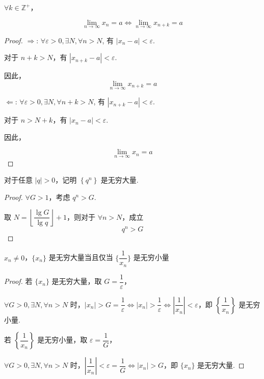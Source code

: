\begin{proposition}
	$\forall k \in \mathbb{Z}^+$，
	
	$$ \lim_{n \to \infty} x_n = a \Leftrightarrow \lim_{n \to \infty} x_{n+k} = a $$
\end{proposition}
\begin{proof}
	$\Rightarrow$: $\forall \varepsilon > 0, \exists N, \forall n > N$, 有 $|x_n - a| < \varepsilon$.
	
	对于 $n + k > N$，有 $|x_{n+k} - a| < \varepsilon$.
	
	因此，
	$$ \lim_{n \to \infty} x_{n+k} = a $$
	
	$\Leftarrow$: $\forall \varepsilon > 0, \exists N, \forall n + k > N$, 有 $|x_{n+k} - a| < \varepsilon$.
	
	对于 $n > N + k$，有 $|x_n - a| < \varepsilon$.
	
	因此，
	
	$$ \lim_{n \to \infty} x_n = a $$
\end{proof}
\begin{example}
	对于任意 $|q| > 0$，记明 $\left\{q^n\right\}$ 是无穷大量.
	
\end{example}
\begin{proof}
	$\forall G> 1$，考虑 $q^n > G$.
	
	取 $N = \left\lfloor \dfrac{\lg G}{\lg q} \right\rfloor + 1$，则对于 $\forall n > N$，成立
	$$ q^n > G$$
\end{proof}
\begin{example}
	$x_n \neq 0$，$\{x_n\}$ 是无穷大量当且仅当 $\{\dfrac{1}{x_n}\}$ 是无穷小量
\end{example}
\begin{proof}
	若 $\{x_n\}$ 是无穷大量，取 $G = \dfrac{1}{\varepsilon}$，
	
	$\forall G > 0, \exists N, \forall n > N$ 时，$|x_n| > G= \dfrac{1}{\varepsilon} \Leftrightarrow |x_n| > \dfrac{1}{\varepsilon} \Leftrightarrow \left|\dfrac{1}{x_n}\right| < \varepsilon$，即 $\left\{\dfrac{1}{x_n}\right\}$ 是无穷小量.
	
	若 $\left\{\dfrac{1}{x_n}\right\}$ 是无穷小量，取 $\varepsilon = \dfrac{1}{G}$，
	
	$\forall G > 0, \exists N, \forall n > N$ 时，$\left|\dfrac{1}{x_n}\right| < \varepsilon = \dfrac{1}{G} \Leftrightarrow |x_n| > G$，即 $\{x_n\}$ 是无穷大量.
\end{proof}



